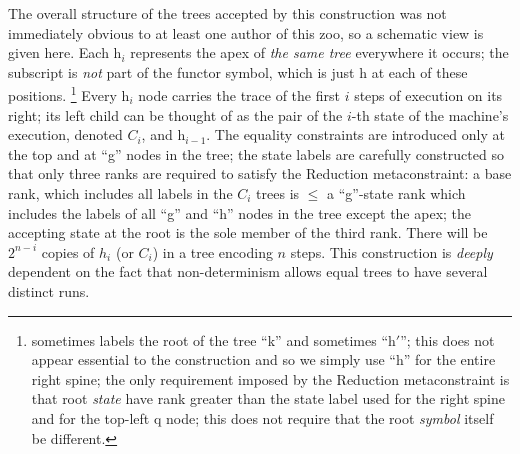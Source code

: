 The overall structure of the trees accepted by this construction was not
immediately obvious to at least one author of this zoo, so a schematic view
is given here.  Each h$_i$ represents the apex of {\em the same tree}
everywhere it occurs; the subscript is {\em not} part of the functor symbol,
which is just h at each of these positions.%
%
\footnote{\cite{tata} sometimes labels the root of the tree ``k'' and
sometimes ``h$'$''; this does not appear essential to the construction and
so we simply use ``h'' for the entire right spine; the only requirement
imposed by the Reduction metaconstraint is that root {\em state} have rank
greater than the state label used for the right spine and for the top-left q
node; this does not require that the root {\em symbol} itself be different.}
%
Every h$_i$ node carries the trace of the first $i$ steps of execution on
its right; its left child can be thought of as the pair of the $i$-th state
of the machine's execution, denoted $C_i$, and h$_{i-1}$.  The equality
constraints are introduced only at the top and at ``g'' nodes in the tree;
the state labels are carefully constructed so that only three ranks are
required to satisfy the Reduction metaconstraint: a base rank, which
includes all labels in the $C_i$ trees is $\le$ a ``g''-state rank which
includes the labels of all ``g'' and ``h'' nodes in the tree except the
apex; the accepting state at the root is the sole member of the third rank.
There will be $2^{n-i}$ copies of $h_i$ (or $C_i$) in a tree encoding $n$
steps.  This construction is {\em deeply} dependent on the fact that
non-determinism allows equal trees to have several distinct runs. 
